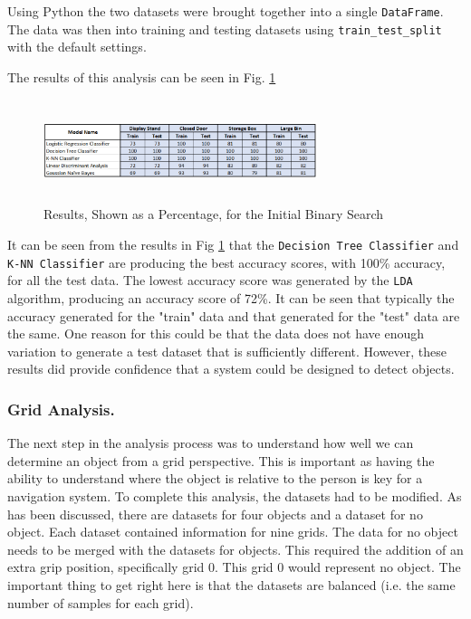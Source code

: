 \documentclass{svproc}
\begin{document}
Using Python the two datasets were brought together into a single \texttt{DataFrame}. The data was then into training and testing datasets using \texttt{train\_test\_split} with the default settings.

The results of this analysis can be seen in Fig. \ref{fig:init_binary}
\begin{figure}[ht]
\includegraphics[width=8cm, height=3cm]{images/initial_binary_search.png}
\centering
\caption{Results, Shown as a Percentage, for the Initial Binary Search}
\label{fig:init_binary}
\end{figure}

It can be seen from the results in Fig \ref{fig:init_binary} that the \texttt{Decision Tree Classifier} and \texttt{K-NN Classifier} are 
producing the best accuracy scores, with 100\% accuracy, for all the test data. The lowest accuracy score was generated by the \texttt{LDA} 
algorithm, producing an accuracy score of 72\%. It can be seen that typically the accuracy generated for the "train" data and that generated 
for the "test" data are the same. One reason for this could be that the data does not have enough variation to generate a test dataset that 
is sufficiently different. However, these results did provide confidence that a system could be designed to detect objects. 

\subsubsection{Grid Analysis.}
The next step in the analysis process was to understand how well we can determine an object from a grid perspective. 
This is important as having the ability to understand where the object is relative to the person is key for a navigation system. To complete this 
analysis, the datasets had to be modified. As has been discussed, there are datasets for four objects and a dataset for no object. Each dataset 
contained information for nine grids. The data for no object needs to be merged with the datasets for objects. This required the addition of 
an extra grip position, specifically grid 0. This grid 0 would represent no object. The important thing to get right here is that the datasets 
are balanced (i.e. the same number of samples for each grid). 
\end{document}
